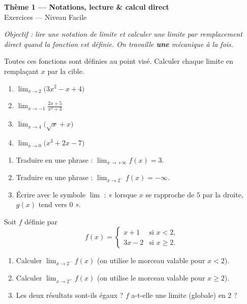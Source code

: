 \documentclass[11pt,a4paper]{article}
\begin{document}
\begin{center}
{\Large\bfseries\color{primarydark}Thème 1 — Notations, lecture \& calcul direct}\\[2pt]
{\large\color{primary}Exercices — Niveau Facile}
\end{center}
\vspace{4pt}
{\small\itshape Objectif : lire une notation de limite et calculer une limite par remplacement direct
quand la fonction est définie. On travaille \textbf{une} mécanique à la fois.}
\vspace{6pt}

\begin{exercice}
Toutes ces fonctions sont définies au point visé. Calculer chaque limite en remplaçant $x$ par la cible.
\begin{enumerate}[label=\alph*),leftmargin=2em,itemsep=3pt]
  \item $\displaystyle\lim_{x\to 2}\bigl(3x^2-x+4\bigr)$
  \item $\displaystyle\lim_{x\to -1}\frac{2x+5}{x^2+3}$
  \item $\displaystyle\lim_{x\to 4}\bigl(\sqrt{x}+x\bigr)$
  \item $\displaystyle\lim_{x\to 0}\bigl(x^3+2x-7\bigr)$
\end{enumerate}
\end{exercice}

\begin{exercice}
\begin{enumerate}[label=\alph*),leftmargin=2em,itemsep=3pt]
  \item Traduire en une phrase : $\displaystyle\lim_{x\to +\infty} f(x)=3$.
  \item Traduire en une phrase : $\displaystyle\lim_{x\to 2^{-}} f(x)=-\infty$.
  \item Écrire avec le symbole $\lim$ : « lorsque $x$ se rapproche de $5$ par la droite, $g(x)$ tend vers $0$ ».
\end{enumerate}
\end{exercice}

\begin{exercice}
Soit $f$ définie par
\[ f(x)=\begin{cases} x+1 & \text{si } x<2,\\[2pt] 3x-2 & \text{si } x\geq 2.\end{cases} \]
\begin{enumerate}[label=\alph*),leftmargin=2em,itemsep=3pt]
  \item Calculer $\displaystyle\lim_{x\to 2^{-}} f(x)$ (on utilise le morceau valable pour $x<2$).
  \item Calculer $\displaystyle\lim_{x\to 2^{+}} f(x)$ (on utilise le morceau valable pour $x\geq 2$).
  \item Les deux résultats sont-ils égaux ? $f$ a-t-elle une limite (globale) en $2$ ?
\end{enumerate}
\end{exercice}
\end{document}
